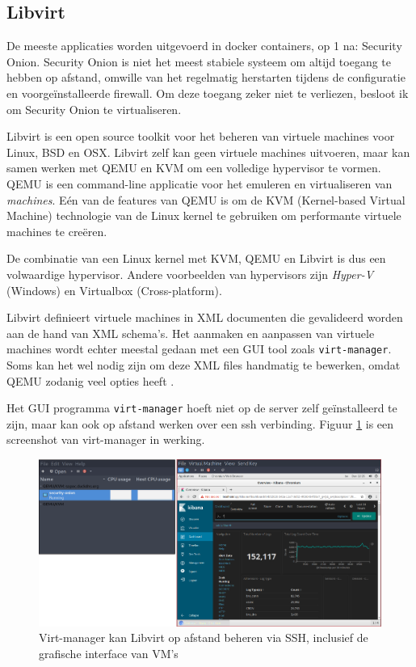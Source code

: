 \documentclass[a4paper,12pt]{report}
\begin{document}
\subsection{Libvirt}
De meeste applicaties worden uitgevoerd in docker containers, op 1 na: Security Onion.
Security Onion is niet het meest stabiele systeem om altijd toegang te hebben op afstand, omwille van het regelmatig herstarten tijdens de configuratie en voorgeïnstalleerde firewall.
Om deze toegang zeker niet te verliezen, besloot ik om Security Onion te virtualiseren.

Libvirt is een open source toolkit voor het beheren van virtuele machines voor Linux, BSD en OSX.
Libvirt zelf kan geen virtuele machines uitvoeren, maar kan samen werken met QEMU en KVM om een volledige hypervisor te vormen.
QEMU is een command-line applicatie voor het emuleren en virtualiseren van \emph{machines}.
Eén van de features van QEMU is om de KVM (Kernel-based Virtual Machine) technologie van de Linux kernel te gebruiken om performante virtuele machines te creëren.

De combinatie van een Linux kernel met KVM, QEMU en Libvirt is dus een volwaardige hypervisor.
Andere voorbeelden van hypervisors zijn \emph{Hyper-V} (Windows) en Virtualbox (Cross-platform).

Libvirt definieert virtuele machines in XML documenten die gevalideerd worden aan de hand van XML schema's.
Het aanmaken en aanpassen van virtuele machines wordt echter meestal gedaan met een GUI tool zoals \lstinline|virt-manager|.
Soms kan het wel nodig zijn om deze XML files handmatig te bewerken, omdat QEMU zodanig veel opties heeft \autocite{libvirt:docs}.

Het GUI programma \lstinline|virt-manager| hoeft niet op de server zelf geïnstalleerd te zijn, maar kan ook op afstand werken over een ssh verbinding.
Figuur \ref{fig:virt-manager} is een screenshot van virt-manager in werking.

\begin{figure}[H]
  \centering
  \includegraphics[width=\textwidth]{virt-manager}
  \caption{Virt-manager kan Libvirt op afstand beheren via SSH, inclusief de grafische interface van VM's}
  \label{fig:virt-manager}
\end{figure}
\end{document}
